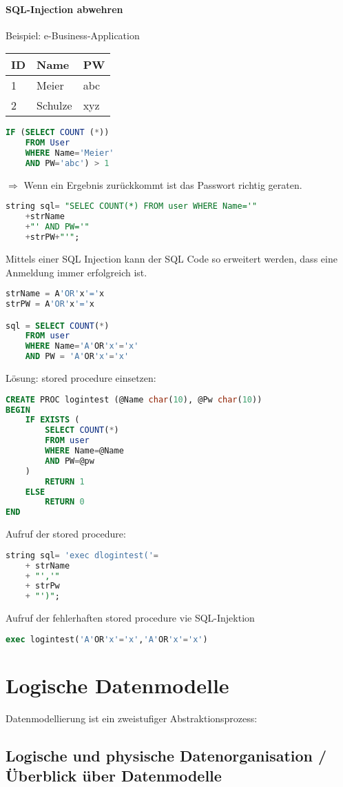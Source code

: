 \subsubsection{SQL-Injection abwehren}
Beispiel: e-Business-Application\\
\begin{tabular}{l | l | l}
	ID & Name & PW\\\hline
	1 & Meier & abc\\
	2 & Schulze & xyz
\end{tabular}
\begin{lstlisting}[language=SQL]
IF (SELECT COUNT (*))
	FROM User
	WHERE Name='Meier'
	AND PW='abc') > 1
\end{lstlisting}
$\Rightarrow$ Wenn ein Ergebnis zurückkommt ist das Passwort richtig geraten.
\begin{lstlisting}[language=SQL]
string sql= "SELEC COUNT(*) FROM user WHERE Name='"
	+strName
	+"' AND PW='"
	+strPW+"'";
\end{lstlisting}
Mittels einer SQL Injection kann der SQL Code so erweitert werden, dass eine Anmeldung immer erfolgreich ist.
\begin{lstlisting}[language=SQL]
strName = A'OR'x'='x
strPW = A'OR'x'='x

sql = SELECT COUNT(*)
	FROM user
	WHERE Name='A'OR'x'='x'
	AND PW = 'A'OR'x'='x'
\end{lstlisting}
Lösung: stored procedure einsetzen:
\begin{lstlisting}[language=SQL]
CREATE PROC logintest (@Name char(10), @Pw char(10))
BEGIN
	IF EXISTS (
		SELECT COUNT(*)
		FROM user
		WHERE Name=@Name
		AND PW=@pw		
	)
		RETURN 1
	ELSE
		RETURN 0
END
\end{lstlisting}
Aufruf der stored procedure:
\begin{lstlisting}[language=SQL]
string sql= 'exec dlogintest('=
	+ strName
	+ "','"
	+ strPw
	+ "')";
\end{lstlisting}
Aufruf der fehlerhaften stored procedure vie SQL-Injektion
\begin{lstlisting}[language=SQL]
exec logintest('A'OR'x'='x','A'OR'x'='x')
\end{lstlisting}
\chapter{Logische Datenmodelle}
Datenmodellierung ist ein zweistufiger Abstraktionsprozess:
\section{Logische und physische Datenorganisation / Überblick über Datenmodelle}
